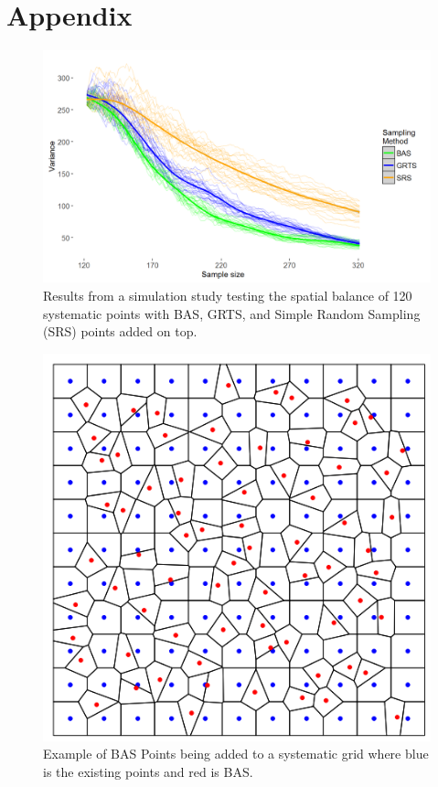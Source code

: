 \documentclass[]{article}
\begin{document}
\section*{Appendix}
\begin{figure}
	\includegraphics[scale = 0.5]{SpatialBalanceTier1}
	\caption{Results from a simulation study testing the spatial balance of 120 systematic points with BAS, GRTS, and Simple Random Sampling (SRS) points added on top.}
	\label{balance}
\end{figure}

\begin{figure}
	\includegraphics[scale = 0.5]{intense}
	\caption{Example of BAS Points being added to a systematic grid where blue is the existing points and red is BAS.}
	\label{voronoi}
\end{figure}
\end{document}
